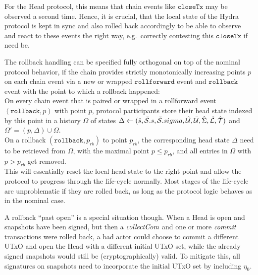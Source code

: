 For the Head protocol, this means that chain events like $\mathtt{closeTx}$ may
be observed a second time. Hence, it is crucial, that the local state of the
Hydra protocol is kept in sync and also rolled back accordingly to be able to
observe and react to these events the right way, e.g.\ correctly contesting this
$\mathtt{closeTx}$ if need be.

The rollback handling can be specified fully orthogonal on top of the nominal
protocol behavior, if the chain provides strictly monotonically increasing
points $p$ on each chain event via a new or wrapped $\mathtt{rollforward}$
event and $\mathtt{rollback}$ event with the point to which a rollback happened:\\

\quad On every chain event that is paired or
wrapped in a rollforward event $(\mathtt{rollback},p)$ with point $p$, protocol
participants store their head state indexed by this point in a history
$\Omega$ of states
$\Delta \gets (\hat s, \bar{\mathcal S}.s, \bar{\mathcal S}.sigma, \hat {\mathcal U}, \bar {\mathcal U}, \hat{\Sigma}, \hat {\mathcal L}, \hat {\mathcal T})$ and $\Omega' = (p, \Delta) \cup \Omega$. \\

\quad On a rollback
$(\mathtt{rollback},p_{rb})$ to point $p_{rb}$, the corresponding head state
$\Delta$ need to be retrieved from $\Omega$, with the maximal point
$p \leq p_{rb}$, and all entries in $\Omega$ with $p > p_{rb}$ get removed. \\

This will essentially reset the local head state to the right point and allow
the protocol to progress through the life-cycle normally. Most stages of the
life-cycle are unproblematic if they are rolled back, as long as the protocol
logic behaves as in the nominal case.

A rollback ``past open'' is a special situation though. When a Head is open and
snapshots have been signed, but then a $\textit{collectCom}$ and one or more
$\textit{commit}$ transactions were rolled back, a bad actor could choose to commit a
different UTxO and open the Head with a different initial UTxO set, while the
already signed snapshots would still be (cryptographically) valid. To mitigate
this, all signatures on snapshots need to incorporate the initial UTxO set by
including $\eta_{0}$. 





